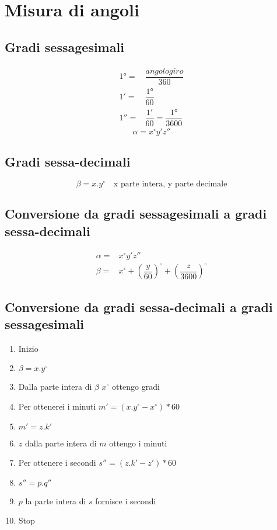 \chapter{Misura di angoli}
\section{Gradi sessagesimali}
\begin{align*}
\ang{1}=&\dfrac{angolo giro}{360}\\
\ang{;1;}=&\dfrac{\ang{1}}{60}\\
\ang{;;1}=&\dfrac{\ang{;1;}}{60}=\dfrac{\ang{1}}{3600}
\end{align*}
\begin{equation*}
\alpha=x^\circ y'z''
\end{equation*}
\section{Gradi sessa-decimali}
\begin{equation*}
\beta=x.y^\circ\quad\text{x parte intera, y parte decimale}
\end{equation*}
\section{Conversione da gradi sessagesimali a gradi sessa-decimali}
\begin{align*}
\alpha=&x^\circ y'z''\\
\beta=&x^\circ+\left(\dfrac{y}{60}\right)^\circ+\left(\dfrac{z}{3600}\right)^\circ
\end{align*}
\section{Conversione da gradi sessa-decimali a gradi sessagesimali}
\begin{enumerate}
	\item Inizio
	\item $\beta=x.y^\circ$
	\item Dalla  parte intera di $\beta$ $x^\circ$ ottengo gradi
	\item Per ottenerei i minuti $m'=(x.y^\circ-x^\circ)*60$
	\item $m'=z.k'$
	\item $z$ dalla parte intera di $m$ ottengo i minuti 
	\item Per ottenere i secondi
	$s''=(z.k'-z')*60$ 
	\item $s''=p.q''$
	\item $p$ la parte intera di $s$ fornisce i secondi
	\item Stop
\end{enumerate}
